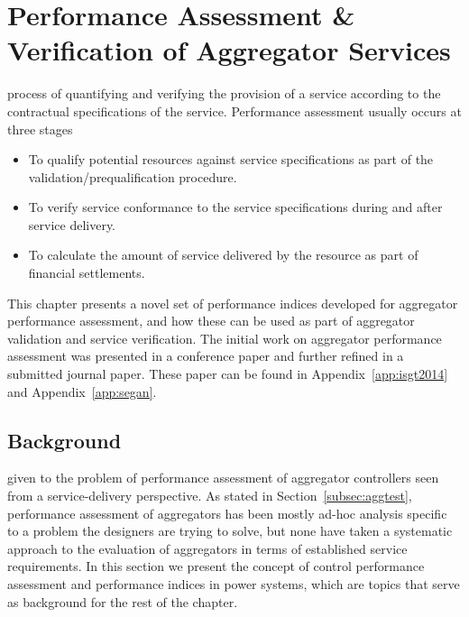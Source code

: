 \chapter{Performance Assessment \& Verification of Aggregator Services} %
\label{cha:verification}
 process of quantifying and verifying the provision of a service according to the contractual specifications of the service. Performance assessment usually occurs at three stages
\begin{itemize}
	\item To qualify potential resources against service specifications as part of the validation/prequalification procedure.
	\item To verify service conformance to the service specifications during and after service delivery. 
	\item To calculate the amount of service delivered by the resource as part of financial settlements.
\end{itemize}

This chapter presents a novel set of performance indices developed for aggregator performance assessment, and how these can be used as part of aggregator validation and service verification. The initial work on aggregator performance assessment was presented in a conference paper and further refined in a submitted journal paper. These paper can be found in Appendix~\ref{app:isgt2014} and Appendix~\ref{app:segan}. 
\section{Background}
 given to the problem of performance assessment of aggregator controllers seen from a service-delivery perspective. As stated in Section~\ref{subsec:aggtest}, performance assessment of aggregators has been mostly ad-hoc analysis specific to a problem the designers are trying to solve, but none have taken a systematic approach to the evaluation of aggregators in terms of established service requirements. In this section we present the concept of control performance assessment and performance indices in power systems, which are topics that serve as background for the rest of the chapter.

